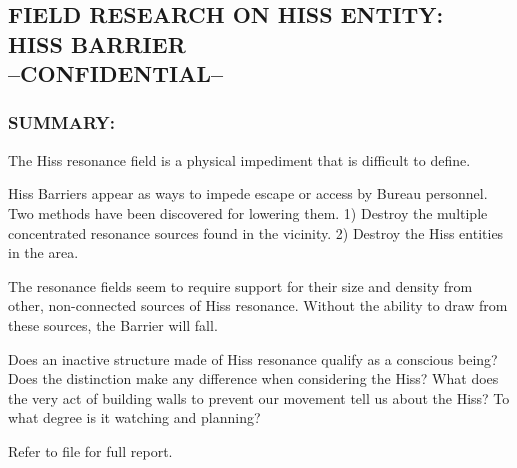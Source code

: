 \subsection*{FIELD RESEARCH ON HISS ENTITY:\\ HISS BARRIER\\
	--CONFIDENTIAL--}
\subsubsection*{SUMMARY:}
\par The Hiss resonance field is a physical impediment that is difficult
to define.
\par Hiss Barriers appear as ways to impede escape or access by
Bureau personnel. Two methods have been discovered for
lowering them. 1) Destroy the multiple concentrated resonance
sources found in the vicinity. 2) Destroy the Hiss entities in the
area.
\par The resonance fields seem to require support for their size and
density from other, non-connected sources of Hiss resonance.
Without the ability to draw from these sources, the Barrier will fall.
\par Does an inactive structure made of Hiss resonance qualify as a
conscious being? Does the distinction make any difference when
considering the Hiss? What does the very act of building walls to
prevent our movement tell us about the Hiss? To what degree is it
watching and planning?
\par Refer to file  for full report.